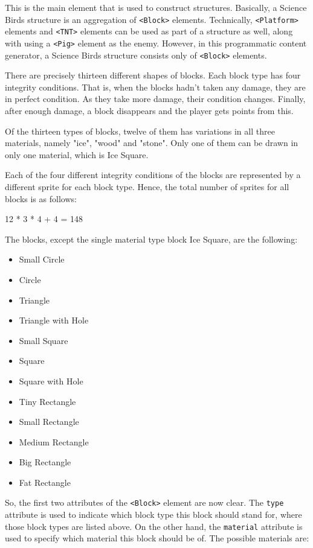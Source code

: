 \documentclass{dalthesis}
\begin{document}
\begin{enumerate}
\begin{enumerate}
    This is the main element that is used to construct structures. Basically, a Science Birds structure is an aggregation of \lstinline{<Block>} elements. Technically, \lstinline{<Platform>} elements and \lstinline{<TNT>} elements can be used as part of a structure as well, along with using a \lstinline{<Pig>} element as the enemy. However, in this programmatic content generator, a Science Birds structure consists only of \lstinline{<Block>} elements.

    There are precisely thirteen different shapes of blocks. Each block type has four integrity conditions. That is, when the blocks hadn't taken any damage, they are in perfect condition. As they take more damage, their condition changes. Finally, after enough damage, a block disappears and the player gets points from this.

    Of the thirteen types of blocks, twelve of them has variations in all three materials, namely "ice", "wood" and "stone". Only one of them can be drawn in only one material, which is Ice Square.

    Each of the four different integrity conditions of the blocks are represented by a different sprite for each block type. Hence, the total number of sprites for all blocks is as follows:

        12 * 3 * 4 + 4 = 148

    The blocks, except the single material type block Ice Square, are the following:

    \begin{itemize}
      \item Small Circle
      \item Circle
      \item Triangle
      \item Triangle with Hole
      \item Small Square
      \item Square
      \item Square with Hole
      \item Tiny Rectangle
      \item Small Rectangle
      \item Medium Rectangle
      \item Big Rectangle
      \item Fat Rectangle
    \end{itemize}

    So, the first two attributes of the \lstinline{<Block>} element are now clear. The \lstinline{type} attribute is used to indicate which block type this block should stand for, where those block types are listed above. On the other hand, the \lstinline{material} attribute is used to specify which material this block should be of. The possible materials are:


\end{enumerate}
\end{enumerate}
\end{document}
